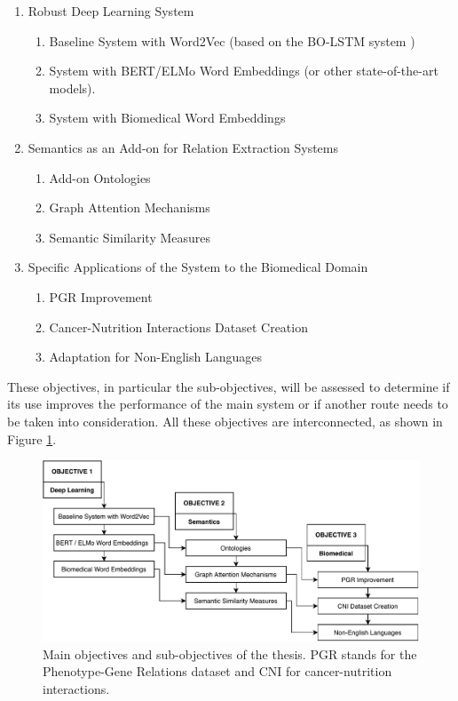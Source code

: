 \begin{enumerate}
\item{Robust Deep Learning System}
\begin{enumerate}
\item{Baseline System with Word2Vec (based on the BO-LSTM system \citep{lamurias2019bo})}
\item{System with BERT/ELMo Word Embeddings (or other state-of-the-art models).}
\item{System with Biomedical Word Embeddings}
\end{enumerate}
\item{Semantics as an Add-on for Relation Extraction Systems}
\begin{enumerate}
\item{Add-on Ontologies}
\item{Graph Attention Mechanisms}
\item{Semantic Similarity Measures}
\end{enumerate}
\item{Specific Applications of the System to the Biomedical Domain}
\begin{enumerate}
\item{PGR Improvement}
\item{Cancer-Nutrition Interactions Dataset Creation}
\item{Adaptation for Non-English Languages}
\end{enumerate}
\end{enumerate}

These objectives, in particular the sub-objectives, will be assessed to determine if its use improves the performance of the main system or if another route needs to be taken into consideration. All these objectives are interconnected, as shown in Figure \ref{figure:objectives}.

\begin{figure}[ht]
\captionsetup{font=small}
\centering
\includegraphics[width=15.5cm]{images/objectives.pdf}
\fontsize{9}{10.8}\caption[Thesis Project Main Objectives]{Main objectives and sub-objectives of the thesis. PGR stands for the Phenotype-Gene Relations dataset and CNI for cancer-nutrition interactions.}
\label{figure:objectives}
\end{figure}

